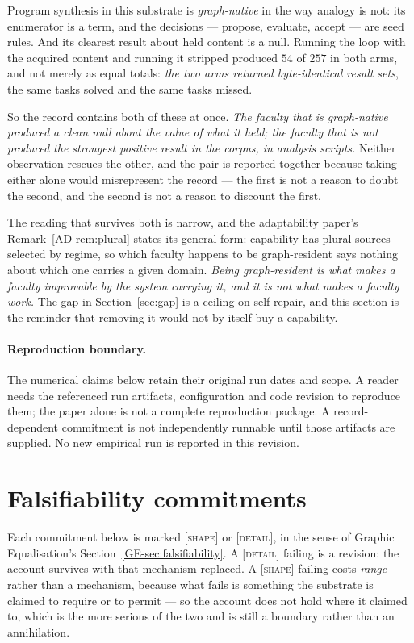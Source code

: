 \documentclass[11pt,a4paper]{article}
\theoremstyle{remark}
\begin{document}
Program synthesis in this substrate is \emph{graph-native} in the way analogy is not: its enumerator is
a term, and the decisions --- propose, evaluate, accept --- are seed rules. And its clearest result
about held content is a null. Running the loop with the acquired content and running it stripped
produced $54$ of $257$ in both arms, and not merely as equal totals: \emph{the two arms returned
byte-identical result sets}, the same tasks solved and the same tasks missed.

So the record contains both of these at once. \emph{The faculty that is graph-native produced a clean
null about the value of what it held; the faculty that is not produced the strongest positive result
in the corpus, in analysis scripts.} Neither observation rescues the other, and the pair is reported
together because taking either alone would misrepresent the record --- the first is not a reason to
doubt the second, and the second is not a reason to discount the first.

The reading that survives both is narrow, and the adaptability paper's Remark~\ref{AD-rem:plural}
states its general form: capability has plural sources selected by regime, so which faculty happens to
be graph-resident says nothing about which one carries a given domain. \emph{Being graph-resident is
what makes a faculty improvable by the system carrying it, and it is not what makes a faculty work.}
The gap in Section~\ref{sec:gap} is a ceiling on self-repair, and this section is the reminder that
removing it would not by itself buy a capability.

\paragraph{Reproduction boundary.} The numerical claims below retain their
original run dates and scope. A reader needs the referenced run artifacts,
configuration and code revision to reproduce them; the paper alone is not a
complete reproduction package. A record-dependent commitment is not independently
runnable until those artifacts are supplied. No new empirical run is reported
in this revision.

\section{Falsifiability commitments}\label{sec:falsifiability}
Each commitment below is marked \textsc{[shape]} or \textsc{[detail]}, in the sense of Graphic
Equalisation's Section~\ref{GE-sec:falsifiability}. A \textsc{[detail]} failing is a revision: the
account survives with that mechanism replaced. A \textsc{[shape]} failing costs \emph{range} rather
than a mechanism, because what fails is something the substrate is claimed to require or to permit ---
so the account does not hold where it claimed to, which is the more serious of the two and is still a
boundary rather than an annihilation.
\end{document}
